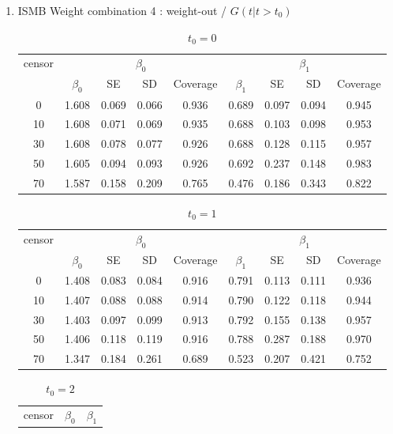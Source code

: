 \documentclass[12pt]{article}
\begin{document}
\begin{enumerate}
\item{ISMB Weight combination 4 : weight-out / $G(t|t>t_0)$}
\begin{table}[hbt!]
	\caption{$t_0=0$}
	\centering
	\begin{tabular}{|c|c|c|c|c|c|c|c|c|}
		\hline
		\multirow{2}{*}{censor} & \multicolumn{4}{c|}{$\beta_0$} & \multicolumn{4}{c|}{$\beta_1$}\\ \cline{2-9}
		& $\beta_0$ & SE & SD  & Coverage  & $\beta_1$ & SE & SD & Coverage\\
		\hline\hline
		0 & 1.608 & 0.069 & 0.066 & 0.936 & 0.689 & 0.097 & 0.094 & 0.945 \\ 
  10 & 1.608 & 0.071 & 0.069 & 0.935 & 0.688 & 0.103 & 0.098 & 0.953 \\ 
  30 & 1.608 & 0.078 & 0.077 & 0.926 & 0.688 & 0.128 & 0.115 & 0.957 \\ 
  50 & 1.605 & 0.094 & 0.093 & 0.926 & 0.692 & 0.237 & 0.148 & 0.983 \\ 
  70 & 1.587 & 0.158 & 0.209 & 0.765 & 0.476 & 0.186 & 0.343 & 0.822 \\ 
		\hline
	\end{tabular}
\end{table}
\begin{table}[hbt!]
	\caption{$t_0=1$}
	\centering
	\begin{tabular}{|c|c|c|c|c|c|c|c|c|}
		\hline
		\multirow{2}{*}{censor} & \multicolumn{4}{c|}{$\beta_0$} & \multicolumn{4}{c|}{$\beta_1$}\\ \cline{2-9}
		& $\beta_0$ & SE & SD  & Coverage  & $\beta_1$ & SE & SD & Coverage\\
		\hline\hline
		0 & 1.408 & 0.083 & 0.084 & 0.916 & 0.791 & 0.113 & 0.111 & 0.936 \\ 
  10 & 1.407 & 0.088 & 0.088 & 0.914 & 0.790 & 0.122 & 0.118 & 0.944 \\ 
  30 & 1.403 & 0.097 & 0.099 & 0.913 & 0.792 & 0.155 & 0.138 & 0.957 \\ 
  50 & 1.406 & 0.118 & 0.119 & 0.916 & 0.788 & 0.287 & 0.188 & 0.970 \\ 
  70 & 1.347 & 0.184 & 0.261 & 0.689 & 0.523 & 0.207 & 0.421 & 0.752 \\ 
		\hline
	\end{tabular}
\end{table}
\begin{table}[hbt!]
	\caption{$t_0=2$}
	\centering
	\begin{tabular}{|c|c|c|c|c|c|c|c|c|}
		\hline
		\multirow{2}{*}{censor} & \multicolumn{4}{c|}{$\beta_0$} & \multicolumn{4}{c|}{$\beta_1$}\\ \cline{2-9}

\end{tabular}
\end{table}
\end{enumerate}
\end{document}
